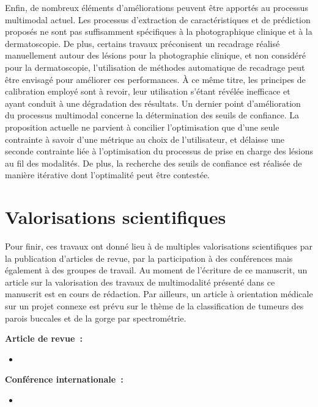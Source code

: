 Enfin, de nombreux éléments d'améliorations peuvent être apportés au processus multimodal actuel. Les processus d'extraction de caractéristiques et de prédiction proposés ne sont pas suffisamment spécifiques à la photographique clinique et à la dermatoscopie. De plus, certains travaux préconisent un recadrage réalisé manuellement autour des lésions pour la photographie clinique, et non considéré pour la dermatoscopie, l'utilisation de méthodes automatique de recadrage peut être envisagé pour améliorer ces performances. À ce même titre, les principes de calibration employé sont à revoir, leur utilisation s'étant révélée inefficace et ayant conduit à une dégradation des résultats. Un dernier point d'amélioration du processus multimodal concerne la détermination des seuils de confiance. La proposition actuelle ne parvient à concilier l'optimisation que d'une seule contrainte à savoir d'une métrique au choix de l'utilisateur, et délaisse une seconde contrainte liée à l'optimisation du processus de prise en charge des lésions au fil des modalités. De plus, la recherche des seuils de confiance est réalisée de manière itérative dont l'optimalité peut être contestée.\par
\clearpage

\section*{Valorisations scientifiques}
Pour finir, ces travaux ont donné lieu à de multiples valorisations scientifiques par la publication d'articles de revue, par la participation à des conférences mais également à des groupes de travail. Au moment de l'écriture de ce manuscrit, un article sur la valorisation des travaux de multimodalité présenté dans ce manuscrit est en cours de rédaction. Par ailleurs, un article à orientation médicale sur un projet connexe est prévu sur le thème de la classification de tumeurs des parois buccales et de la gorge par spectrométrie.\par

\textbf{Article de revue~:}
\vspace{-0.1cm}
\begin{itemize}
    \item {}
\end{itemize}

\textbf{Conférence internationale~:}
\vspace{-0.2cm}
\begin{itemize}
    \item {}
\end{itemize}

